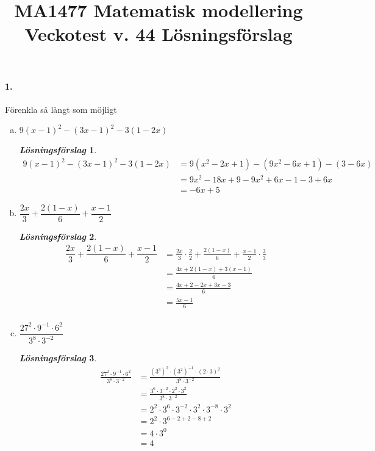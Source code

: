 \documentclass[a4paper]{article}
\title{\bf MA1477 Matematisk modellering \\[10pt]  Veckotest v.
  44 Lösningsförslag}
\newtheorem*{sol}{\normalfont\textit{Lösningsförslag}}
\begin{document}
\maketitle

\paragraph{1.} Förenkla så långt som möjligt
\begin{enumerate}[(a)]
\item $9(x-1)^2 - (3x-1)^2 - 3(1-2x)$
  \begin{sol}
    \begin{align*}
      9(x-1)^2 - (3x-1)^2 - 3(1-2x) 
      &= 9(x^2- 2x +1) - (9x^2 - 6x +1) - (3-6x)\\[1em]
      &= 9x^2 - 18x + 9 - 9x^2 +6x -1 -3 + 6x \\[1em]
      &= -6x +5
    \end{align*}
  \end{sol}
\item $\dfrac{2x}{3} + \dfrac{2(1-x)}{6} + \dfrac{x-1}{2}$
  \begin{sol}
    \begin{align*}
      \dfrac{2x}{3} + \dfrac{2(1-x)}{6} + \dfrac{x-1}{2} 
      &= \frac{2x}{3}\cdot \frac{2}{2} + \frac{2(1-x)}{6} +
        \frac{x-1}{2} \cdot \frac{3}{3} \\[1em]
      &= \frac{4x + 2(1-x)+ 3(x-1)}{6} \\[1em]
      &= \frac{4x + 2-2x +3x-3}{6} \\[1em]
      &= \frac{5x-1}{6} \\[1em]
    \end{align*}
  \end{sol}
\item $\dfrac{27^2\cdot 9^{-1}\cdot 6^2}{3^8\cdot 3^{-2}}$
  \begin{sol}
    \begin{align*}
      \frac{27^2\cdot 9^{-1}\cdot 6^2}{3^8\cdot 3^{-2}}
      &= \frac{(3^3)^2\cdot (3^2)^{-1}\cdot (2\cdot 3)^2}{3^8\cdot
        3^{-2}} \\[1em]
      &= \frac{3^6\cdot 3^{-2}\cdot 2^2 \cdot 3^2}{3^8\cdot 3^{-2}}
      \\[1em]
      &= 2^2\cdot 3^6\cdot 3^{-2}\cdot 3^2 \cdot 3^{-8} \cdot 3^2 \\[1em]
      &= 2^2\cdot 3^{6-2+2-8+2} \\[1em]
      &= 4\cdot 3^0 \\[1em]
      & = 4
    \end{align*}

\end{sol}
\end{enumerate}
\end{document}
